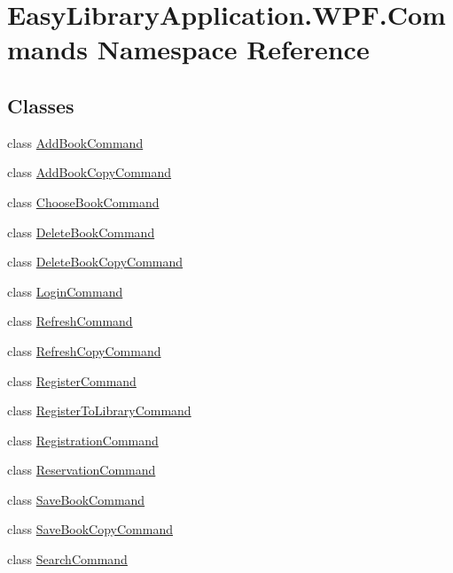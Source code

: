 \hypertarget{namespace_easy_library_application_1_1_w_p_f_1_1_commands}{}\section{Easy\+Library\+Application.\+W\+P\+F.\+Commands Namespace Reference}
\label{namespace_easy_library_application_1_1_w_p_f_1_1_commands}
\subsection*{Classes}
\begin{DoxyCompactItemize}
\item 
class \mbox{\hyperlink{class_easy_library_application_1_1_w_p_f_1_1_commands_1_1_add_book_command}{Add\+Book\+Command}}
\item 
class \mbox{\hyperlink{class_easy_library_application_1_1_w_p_f_1_1_commands_1_1_add_book_copy_command}{Add\+Book\+Copy\+Command}}
\item 
class \mbox{\hyperlink{class_easy_library_application_1_1_w_p_f_1_1_commands_1_1_choose_book_command}{Choose\+Book\+Command}}
\item 
class \mbox{\hyperlink{class_easy_library_application_1_1_w_p_f_1_1_commands_1_1_delete_book_command}{Delete\+Book\+Command}}
\item 
class \mbox{\hyperlink{class_easy_library_application_1_1_w_p_f_1_1_commands_1_1_delete_book_copy_command}{Delete\+Book\+Copy\+Command}}
\item 
class \mbox{\hyperlink{class_easy_library_application_1_1_w_p_f_1_1_commands_1_1_login_command}{Login\+Command}}
\item 
class \mbox{\hyperlink{class_easy_library_application_1_1_w_p_f_1_1_commands_1_1_refresh_command}{Refresh\+Command}}
\item 
class \mbox{\hyperlink{class_easy_library_application_1_1_w_p_f_1_1_commands_1_1_refresh_copy_command}{Refresh\+Copy\+Command}}
\item 
class \mbox{\hyperlink{class_easy_library_application_1_1_w_p_f_1_1_commands_1_1_register_command}{Register\+Command}}
\item 
class \mbox{\hyperlink{class_easy_library_application_1_1_w_p_f_1_1_commands_1_1_register_to_library_command}{Register\+To\+Library\+Command}}
\item 
class \mbox{\hyperlink{class_easy_library_application_1_1_w_p_f_1_1_commands_1_1_registration_command}{Registration\+Command}}
\item 
class \mbox{\hyperlink{class_easy_library_application_1_1_w_p_f_1_1_commands_1_1_reservation_command}{Reservation\+Command}}
\item 
class \mbox{\hyperlink{class_easy_library_application_1_1_w_p_f_1_1_commands_1_1_save_book_command}{Save\+Book\+Command}}
\item 
class \mbox{\hyperlink{class_easy_library_application_1_1_w_p_f_1_1_commands_1_1_save_book_copy_command}{Save\+Book\+Copy\+Command}}
\item 
class \mbox{\hyperlink{class_easy_library_application_1_1_w_p_f_1_1_commands_1_1_search_command}{Search\+Command}}
\end{DoxyCompactItemize}
